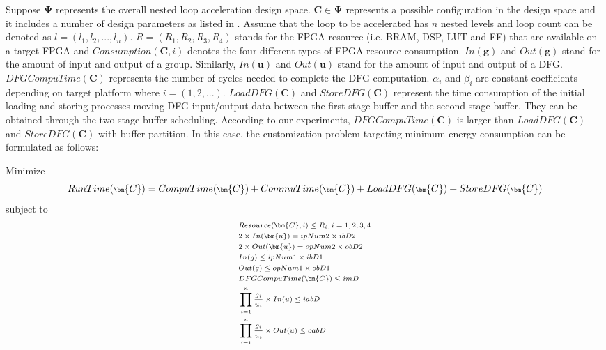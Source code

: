 \begin{table}
{{      }
  }
\end{table}


Suppose $\bm{\Psi}$ represents the overall nested loop acceleration design 
space. $\bm{C} \in \bm{\Psi}$ represents a possible configuration in 
the design space and it includes a number of design parameters as  
listed in . Assume that the loop to be accelerated 
has $n$ nested levels and loop count can be denoted as $l=(l_1, l_2, ..., l_n)$.
$R=(R_1, R_2, R_3, R_4)$ stands for the FPGA resource (i.e. BRAM, DSP, LUT and FF) 
that are available on a target FPGA and $Consumption(\bm{C}, i)$ denotes the 
four different types of FPGA resource consumption. $In(\bm{g})$ and $Out(\bm{g})$ 
stand for the amount of input and output of a group. Similarly, $In(\bm{u})$ 
and $Out(\bm{u})$ stand for the amount of input and output of a DFG. 
$DFGCompuTime(\bm{C})$ represents the number of cycles needed to 
complete the DFG computation. $\alpha_i$ and $\beta_i$ are constant 
coefficients depending on target platform where $i=(1,2,...)$. $LoadDFG(\bm{C})$ and
$StoreDFG(\bm{C})$ represent the time consumption of the initial loading and storing processes
moving DFG input/output data between the first stage buffer and the second stage buffer. They can be obtained through
the two-stage buffer scheduling. According to our experiments, $DFGCompuTime(\bm{C})$ is larger than
$LoadDFG(\bm{C})$ and $StoreDFG(\bm{C})$ with buffer partition. In this case, the customization
problem targeting minimum energy consumption can be formulated as follows:

Minimize 
\begin{equation} \label{eq:runtime}
    \scriptsize
    RunTime(\bm{C})=CompuTime(\bm{C})+CommuTime(\bm{C})+LoadDFG(\bm{C})+StoreDFG(\bm{C})
\end{equation}
subject to
\begin{equation} \label{eq:constraints}
    \scriptsize
    \begin{split}
        &Resource(\bm{C}, i) \leq R_i, i=1,2,3,4 \\
        &2 \times In(\bm{u}) = ipNum2 \times ibD2 \\
        &2 \times Out(\bm{u}) = opNum2 \times obD2 \\
        &In(g) \leq ipNum1 \times ibD1 \\
        &Out(g) \leq opNum1 \times obD1 \\
        &DFGCompuTime(\bm{C}) \leq imD \\
        &\displaystyle \prod_{i=1}^{n} \frac{g_i}{u_i} \times In(u) \leq iabD \\
        &\displaystyle \prod_{i=1}^{n} \frac{g_i}{u_i} \times Out(u) \leq oabD
    \end{split}
\end{equation}

